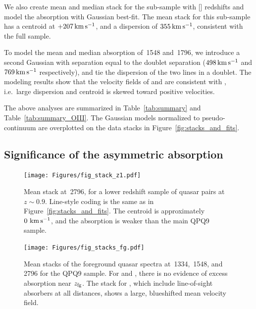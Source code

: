 \documentclass[iop]{emulateapj}
\begin{document}
We also create mean and median stack for the sub-sample with [] redshifts and model the 
absorption with Gaussian best-fit. The  mean stack for this sub-sample has a centroid at 
$+207\,{\rm km\,s^{-1}}$, and a dispersion of $355\,{\rm km\,s^{-1}}$, consistent with the full 
sample. 

To model the mean and median absorption of \,1548 and \,1796, we introduce a  
second Gaussian with separation equal to the doublet separation ($498\,{\rm km\,s^{-1}}$ and 
$769\,{\rm km\,s^{-1}}$ respectively), and tie the dispersion of the two lines in a doublet. The 
modeling results show that the velocity fields of  and  are consistent with 
, i.e.\ large dispersion and centroid is skewed toward positive velocities. 

The above analyses are summarized in Table~\ref{tab:summary} and Table~\ref{tab:summary_OIII}. The 
Gaussian models normalized to pseudo-continuum are overplotted on the data stacks in 
Figure~\ref{fig:stacks_and_fits}. 

\subsection{Significance of the asymmetric absorption}
\label{sec:significance_+ve}

\begin{figure}[!h]
\begin{minipage}[!bp]{0.35\textwidth}
\texttt{[image: Figures/fig\_stack\_z1.pdf]}
\caption{Mean stack at \,2796, for a lower redshift sample of quasar pairs at 
$z\sim0.9$. Line-style coding is the same as in Figure~\ref{fig:stacks_and_fits}. The centroid is 
approximately $0\,{\rm \,km\,s^{-1}}$, and the absorption is weaker than the main QPQ9 sample. 
}
\label{fig:stack_z1}
\end{minipage}%
\hspace{0.5in}
\begin{minipage}[!bp]{0.55\textwidth}
\texttt{[image: Figures/fig\_stacks\_fg.pdf]}
\caption{Mean stacks of the foreground quasar spectra at \,1334, \,1548, and 
\,2796 for the QPQ9 sample. For  and , there is no evidence of 
excess absorption near $z_{\rm fg}$. The stack for , which include line-of-sight 
absorbers at all distances, shows a large, blueshifted mean velocity field.
}
\label{fig:stacks_fg}
\end{minipage}
\end{figure}
\end{document}
